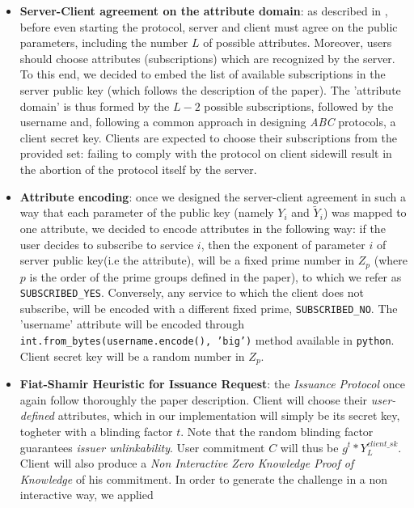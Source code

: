 \documentclass[10pt,conference,compsocconf]{IEEEtran}
\begin{document}
\begin{itemize}
    \item \textbf{Server-Client agreement on the attribute domain}: as described
    in \cite{PS_signature}, before even starting the protocol, server and client
    must agree on the public parameters, including the number $L$ of possible
    attributes. Moreover, users should choose attributes (subscriptions) which
    are recognized by the server. To this end, we decided to embed the list of
    available subscriptions in the server public key (which follows the
    description of the paper). The 'attribute domain' is thus formed by the
    $L-2$ possible subscriptions, followed by the username and, following a
    common approach in designing \textit{ABC} protocols, a client secret key.
    Clients are expected to choose their subscriptions from the provided set:
    failing to comply with the protocol on client sidewill result in the
    abortion of the protocol itself by the server.
    \item \textbf{Attribute encoding}: once we designed the server-client
    agreement in such a way that each parameter of the public key (namely $Y_i$
    and $\tilde{Y}_{i}$) was mapped to one attribute, we decided to encode
    attributes in the following way: if the user decides to subscribe to service
    $i$, then the exponent of parameter $i$ of server public key(i.e the
    attribute), will be a fixed prime number in $Z_p$ (where $p$ is the order of
    the prime groups defined in the paper), to which we refer as
    \texttt{SUBSCRIBED\_YES}. Conversely, any service to which the client does
    not subscribe, will be encoded with a different fixed prime,
    \texttt{SUBSCRIBED\_NO}. The 'username' attribute will be encoded through
    \texttt{int.from\_bytes(username.encode(), 'big')} method available in
    \texttt{python}. Client secret key will be a random number in $Z_p$.
    \item \textbf{Fiat-Shamir Heuristic for Issuance Request}: the
    \textit{Issuance Protocol} once again follow thoroughly the paper
    description. Client will choose their \textit{user-defined} attributes,
    which in our implementation will simply be its secret key, togheter with a
    blinding factor $t$. Note that the random blinding factor guarantees
    \textit{issuer unlinkability}. User commitment $C$ will thus be
    $g^{t}*Y_{L}^{client\_sk}$. Client will also produce a \textit{Non
    Interactive Zero Knowledge Proof of Knowledge} of his commitment. In order
    to generate the challenge in a non interactive way, we applied

\end{itemize}
\end{document}
